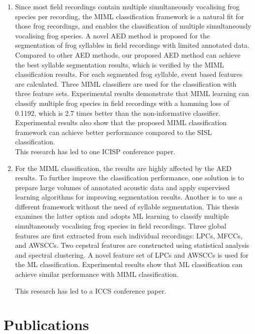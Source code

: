 \begin{enumerate}
\item Since most field recordings contain multiple simultaneously vocalising frog species per recording, the MIML classification framework is a natural fit for those frog recordings, and enables the classification of multiple simultaneously vocalising frog species. A novel AED method is proposed for the segmentation of frog syllables in field recordings with limited annotated data. Compared to other AED methods, our proposed AED method can achieve the best syllable segmentation results, which is verified by the MIML classification results. For each segmented frog syllable, event based features are calculated. Three MIML classifiers are used for the classification with three feature sets.
Experimental results demonstrate that MIML learning can classify multiple frog species in field recordings with a hamming loss of 0.1192, which is 2.7 times better than the non-informative classifier. Experimental results also show that the proposed MIML classification framework can achieve better performance compared to the SISL classification.
\\
This research has led to one ICISP conference paper.

\item For the MIML classification, the results are highly affected by the AED results. To further improve the classification performance, one solution is to prepare large volumes of annotated acoustic data and apply supervised learning algorithms for improving segmentation results. Another is to use a different framework without the need of syllable segmentation. This thesis examines the latter option and adopts ML learning to classify multiple simultaneously vocalising frog species in field recordings. Three global features are first extracted from each individual recordings: LPCs, MFCCs, and AWSCCs. Two cepstral features are constructed using statistical analysis and spectral clustering. 
A novel feature set of LPCs and AWSCCs is used for the ML classification.  Experimental results show that ML classification can achieve similar performance with MIML classification. 

This research has led to a ICCS conference paper.


\end{enumerate}
 




\section{Publications}

